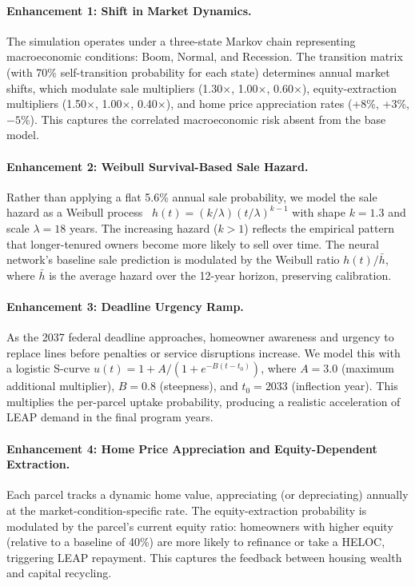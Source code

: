 \documentclass[11pt, letterpaper]{article}
\begin{document}
\paragraph{Enhancement 1: Shift in Market Dynamics.} The simulation operates under a three-state Markov chain representing macroeconomic conditions: Boom, Normal, and Recession. The transition matrix (with 70\% self-transition probability for each state) determines annual market shifts, which modulate sale multipliers (1.30$\times$, 1.00$\times$, 0.60$\times$), equity-extraction multipliers (1.50$\times$, 1.00$\times$, 0.40$\times$), and home price appreciation rates (+8\%, +3\%, $-5$\%). This captures the correlated macroeconomic risk absent from the base model.

\paragraph{Enhancement 2: Weibull Survival-Based Sale Hazard.} Rather than applying a flat 5.6\% annual sale probability, we model the sale hazard as a Weibull process~\cite{lawless2003} $h(t) = (k/\lambda)(t/\lambda)^{k-1}$ with shape $k = 1.3$ and scale $\lambda = 18$ years. The increasing hazard ($k > 1$) reflects the empirical pattern that longer-tenured owners become more likely to sell over time. The neural network's baseline sale prediction is modulated by the Weibull ratio $h(t) / \bar{h}$, where $\bar{h}$ is the average hazard over the 12-year horizon, preserving calibration.

\paragraph{Enhancement 3: Deadline Urgency Ramp.} As the 2037 federal deadline approaches, homeowner awareness and urgency to replace lines before penalties or service disruptions increase. We model this with a logistic S-curve $u(t) = 1 + A / (1 + e^{-B(t - t_0)})$, where $A = 3.0$ (maximum additional multiplier), $B = 0.8$ (steepness), and $t_0 = 2033$ (inflection year). This multiplies the per-parcel uptake probability, producing a realistic acceleration of LEAP demand in the final program years.

\paragraph{Enhancement 4: Home Price Appreciation and Equity-Dependent Extraction.} Each parcel tracks a dynamic home value, appreciating (or depreciating) annually at the market-condition-specific rate. The equity-extraction probability is modulated by the parcel's current equity ratio: homeowners with higher equity (relative to a baseline of 40\%) are more likely to refinance or take a HELOC, triggering LEAP repayment. This captures the feedback between housing wealth and capital recycling.
\end{document}
